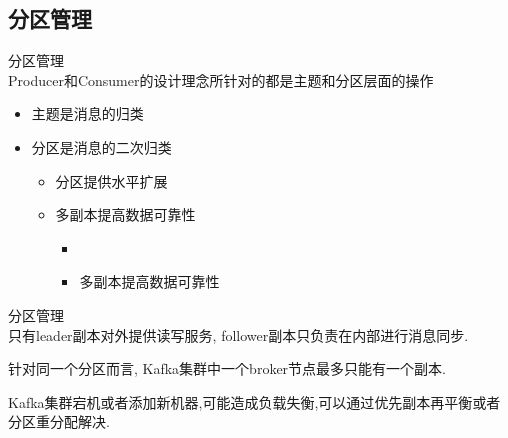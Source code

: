 \subsection{分区管理}
\begin{frame}[plain,t]{分区管理} %
	 \\  \vspace{2ex}
    Producer和Consumer的设计理念所针对的都是主题和分区层面的操作
    
    \vspace{2ex}
    \begin{itemize}
        \item 主题是消息的归类
        \item 分区是消息的二次归类
        \begin{itemize}
            \item 分区提供水平扩展
            \item 多副本提高数据可靠性
            \begin{itemize}
                \item 
                \item 多副本提高数据可靠性
            \end{itemize}
        \end{itemize}
    \end{itemize}


\end{frame}
\begin{frame}[plain,t]{分区管理} %
     \\  \vspace{2ex}
    只有leader副本对外提供读写服务, follower副本只负责在内部进行消息同步.
    
    \vspace{2ex}
    针对同一个分区而言, Kafka集群中一个broker节点最多只能有一个副本.
    
    \vspace{2ex}
    Kafka集群{\color{cyan}宕机}或者添加{\color{red}新机器},可能造成负载失衡,可以通过{\color{cyan}优先副本再平衡}或者{\color{red}分区重分配}解决.
    
    
\end{frame}
